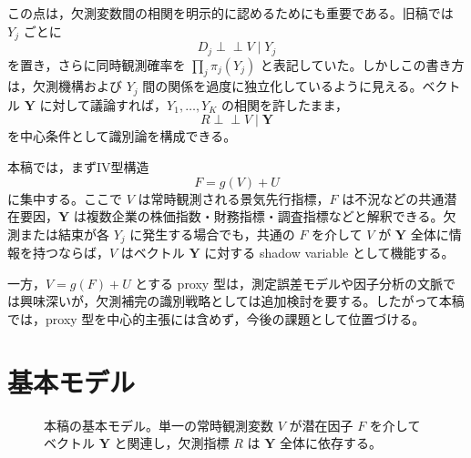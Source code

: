 \documentclass[dvipdfmx,autodetect-engine]{jsarticle}
\newcommand{\indep}{\mathrel{\perp\!\!\!\perp}}
\newcommand{\1}{\mathbf{1}}
\newcommand{\Y}{\bm{Y}}
\begin{document}
この点は，欠測変数間の相関を明示的に認めるためにも重要である。旧稿では $Y_j$ ごとに
\begin{equation}
  D_j\indep V\mid Y_j
\end{equation}
を置き，さらに同時観測確率を $\prod_j \pi_j(Y_j)$ と表記していた。しかしこの書き方は，欠測機構および $Y_j$ 間の関係を過度に独立化しているように見える。ベクトル $\Y$ に対して議論すれば，$Y_1,\ldots,Y_K$ の相関を許したまま，
\begin{equation}
  R\indep V\mid \Y
  \label{eq:vector-shadow-condition-intro}
\end{equation}
を中心条件として識別論を構成できる。

本稿では，まずIV型構造
\begin{equation}
  F=g(V)+U
  \label{eq:iv-latent-main}
\end{equation}
に集中する。ここで $V$ は常時観測される景気先行指標，$F$ は不況などの共通潜在要因，$\Y$ は複数企業の株価指数・財務指標・調査指標などと解釈できる。欠測または結束が各 $Y_j$ に発生する場合でも，共通の $F$ を介して $V$ が $\Y$ 全体に情報を持つならば，$V$ はベクトル $\Y$ に対する shadow variable として機能する。

一方，$V=g(F)+U$ とする proxy 型は，測定誤差モデルや因子分析の文脈では興味深いが，欠測補完の識別戦略としては追加検討を要する。したがって本稿では，proxy 型を中心的主張には含めず，今後の課題として位置づける。

\section{基本モデル}

\begin{figure}[tbp]
\centering
{}
\caption{本稿の基本モデル。単一の常時観測変数 $V$ が潜在因子 $F$ を介してベクトル $\Y$ と関連し，欠測指標 $R$ は $\Y$ 全体に依存する。}
\label{fig:dag-vector-basic}
\end{figure}
\end{document}
